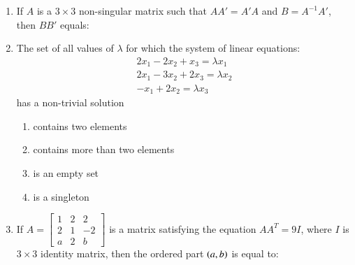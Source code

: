 \documentclass[journal,12pt,twocolumn]{IEEEtran}
\theoremstyle{remark}
\begin{document}
\begin{enumerate}
	\item If $A$ is a $3\times3$ non-singular matrix such that $AA'=A'A$ and $B=A^{-1}A'$, then $BB'$ equals:
	\hfill {}{\par}
        \begin{enumerate}[label={(\alph*)}]
        \end{enumerate}


    \item The set of all values of $\lambda$ for which the system of linear equations:
	\begin{align*}
		2x_1-2x_2+x_3 = \lambda x_1\\
		2x_1-3x_2+2x_3 = \lambda x_2\\
		-x_1+2x_2= \lambda x_3
	\end{align*}
	has a non-trivial solution

	\hfill{}
	\begin{enumerate}[label={(\alph*)}]
		\item contains two elements
		\item contains more than two elements
		\item is an empty set
		\item is a singleton
	\end{enumerate}


	\item If $A = \begin{bmatrix}1&2&2\\2&1&-2\\a&2&b\end{bmatrix}$ is a matrix satisfying the equation $AA^T = 9I$, where $I$ is $3\times3$ identity matrix, then the ordered part $\left(a,b\right)$ is equal to:
	\hfill {}{\par}
	\begin{enumerate}[label={(\alph*)}]


\end{enumerate}
\end{enumerate}
\end{document}
